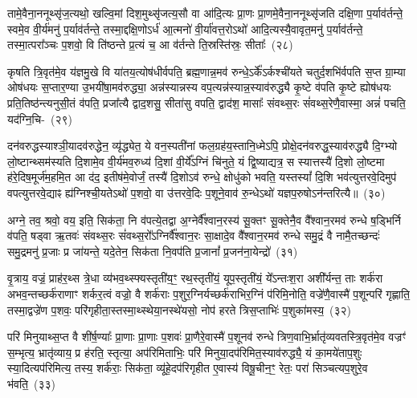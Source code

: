 तामे॒वैना॒ननूथ्सृ॑ज॒त्यथो॒ खल्वि॒मां दिश॒मुथ्सृ॑जत्य॒सौ वा आ॑दि॒त्यः प्रा॒णः प्रा॒णमे॒वैना॒ननूथ्सृ॑जति दक्षि॒णा प॒र्याव॑र्तन्ते॒ स्वमे॒व वी॒र्य॑मनु॑ प॒र्याव॑र्तन्ते॒ तस्मा॒द्दक्षि॒णो\-ऽर्ध॑ आ॒त्मनो॑ वी॒र्या॑वत्त॒रो\-ऽथो॑ आदि॒त्यस्यै॒वावृत॒मनु॑ प॒र्याव॑र्तन्ते॒ तस्मा॒त्परा᳚ञ्चः प॒शवो॒ वि ति॑ष्ठन्ते प्र॒त्यं च॒ आ व॑र्तन्ते ति॒स्रस्ति॑स्रः॒ सीताः᳚~(२८)\ip

कृषति त्रि॒वृत॑मे॒व य॑ज्ञमु॒खे वि या॑तय॒त्योष॑धीर्वपति॒ ब्रह्म॒णान्न॒मव॑ रुन्धे॒\-ऽर्के᳚\-ऽर्कश्ची॑यते चतुर्द॒शभि॑र्वपति स॒प्त ग्रा॒म्या ओष॑धयः स॒प्तार॒ण्या उ॒भयी॑षा॒मव॑रुद्ध्या॒ अन्न॑स्यान्नस्य वप॒त्यन्न॑स्यान्न॒स्याव॑रुद्ध्यै कृ॒ष्टे व॑पति कृ॒ष्टे ह्योष॑धयः प्रति॒तिष्ठ॑न्त्यनुसी॒तं व॑पति॒ प्रजा᳚त्यै द्वाद॒शसु॒ सीता॑सु वपति॒ द्वाद॑श॒ मासाः᳚ संवथ्स॒रः सं॑वथ्स॒रेणै॒वास्मा॒ अन्नं॑ पचति॒ यद॑ग्नि॒चि-~(२९)\ip

दन॑वरुद्धस्याश्ञी॒यादव॑रुद्धेन॒ व्यृ॑द्ध्येत॒ ये वन॒स्पती॑नां फल॒ग्रह॑य॒स्तानि॒ध्मे\-ऽपि॒ प्रोक्षे॒दन॑वरुद्ध॒स्याव॑रुद्ध्यै दि॒ग्भ्यो लो॒ष्टान्थ्सम॑स्यति दि॒शामे॒व वी॒र्य॑मव॒रुध्य॑ दि॒शां वी॒र्ये᳚\-ऽग्निं चि॑नुते॒ यं द्वि॒ष्याद्यत्र॒ स स्यात्तस्यै॑ दि॒शो लो॒ष्टमा ह॑रे॒दिष॒मूर्ज॑म॒हमि॒त आ द॑द॒ इतीष॑मे॒वोर्जं॒ तस्यै॑ दि॒शो\-ऽव॑ रुन्धे॒ क्षोधु॑को भवति॒ यस्तस्यां᳚ दि॒शि भव॑त्युत्तरवे॒दिमुप॑ वपत्युत्तरवे॒द्याꣴ ह्य॑ग्निश्ची॒यते\-ऽथो॑ प॒शवो॒ वा उ॑त्तरवे॒दिः प॒शूने॒वाव॑ रु॒न्धे\-ऽथो॑ यज्ञप॒रुषो\-ऽन॑न्तरित्यै॥~(३०)\ip

{\anuvakamend[{च॒ भ॒व॒त्ये॒ताव॒द्वै पुरु॑षे वी॒र्यं॑ यत्कृ॒ष्टञ्चाकृ॑ष्टं च॒ दिख्सीता॑ अग्नि॒चिदव॒ पञ्च॑विꣳशतिश्च}]}

अग्ने॒ तव॒ श्रवो॒ वय॒ इति॒ सिक॑ता॒ नि व॑पत्ये॒तद्वा अ॒ग्नेर्वै᳚श्वान॒रस्य॑ सू॒क्तꣳ सू॒क्तेनै॒व वै᳚श्वान॒रमव॑ रुन्धे ष॒ड्भिर्नि व॑पति॒ षड्वा ऋ॒तवः॑ संवथ्स॒रः सं॑वथ्स॒रो᳚\-ऽग्निर्वै᳚श्वान॒रः सा॒क्षादे॒व वै᳚श्वान॒रमव॑ रुन्धे समु॒द्रं वै नामै॒तच्छन्दः॑ समु॒द्रमनु॑ प्र॒जाः प्र जा॑यन्ते॒ यदे॒तेन॒ सिक॑ता नि॒वप॑ति प्र॒जानां᳚ प्र॒जन॑ना॒येन्द्रो॑~(३१)\ip

वृ॒त्राय॒ वज्रं॒ प्राह॑र॒थ्स त्रे॒धा व्य॑भव॒थ्स्फ्यस्तृती॑य॒ꣳ॒ रथ॒स्तृती॑यं॒ यूप॒स्तृती॑यं॒ ये᳚\-ऽन्तःश॒रा अशी᳚र्यन्त॒ ताः शर्क॑रा अभव॒न्तच्छर्क॑राणाꣳ शर्कर॒त्वं वज्रो॒ वै शर्क॑राः प॒शुर॒ग्निर्यच्छर्क॑राभिर॒ग्निं प॑रिमि॒नोति॒ वज्रे॑णै॒वास्मै॑ प॒शून्परि॑ गृह्णाति॒ तस्मा॒द्वज्रे॑ण प॒शवः॒ परि॑गृहीता॒स्तस्मा॒थ्स्थेया॒नस्थे॑यसो॒ नोप॑ हरते त्रिस॒प्ताभिः॑ प॒शुका॑मस्य॒~(३२)\ip

परि॑ मिनुयाथ्स॒प्त वै शी॑र्\mbox{}ष॒ण्याः᳚ प्रा॒णाः प्रा॒णाः प॒शवः॑ प्रा॒णैरे॒वास्मै॑ प॒शूनव॑ रुन्धे त्रिण॒वाभि॒\-र्भ्रातृ॑व्यवतस्त्रि॒वृत॑मे॒व वज्रꣳ॑ स॒म्भृत्य॒ भ्रातृ॑व्याय॒ प्र ह॑रति॒ स्तृत्या॒ अप॑रिमिताभिः॒ प\-रि॑ मिनुया॒दप॑रिमित॒स्याव॑रुद्ध्यै॒ यं का॒मये॑ताप॒शुः स्या॒दित्यप॑रिमित्य॒ तस्य॒ शर्क॑राः॒ सिक॑ता॒ व्यू॑हे॒दप॑रिगृहीत ए॒वास्य॑ विषू॒चीन॒ꣳ॒ रेतः॒ परा॑ सिञ्चत्यप॒शुरे॒व भ॑वति॒~(३३)\ip

